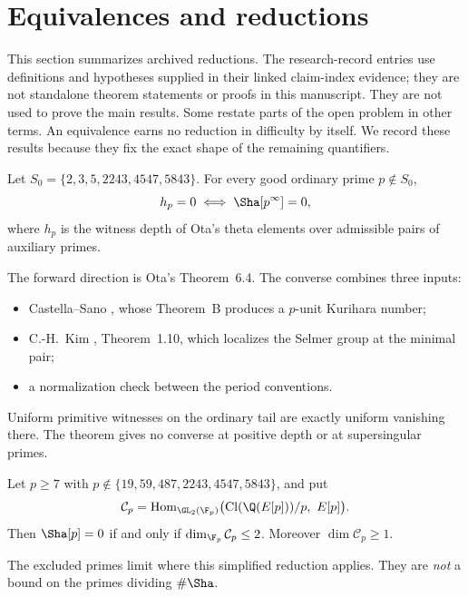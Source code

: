 \section{Equivalences and reductions}\label{sec:reductions}

This section summarizes archived reductions. The research-record entries use definitions and hypotheses supplied in their linked claim-index evidence; they are not standalone theorem statements or proofs in this manuscript. They are not used to prove the main results. Some restate parts of the open problem in other terms. An equivalence earns no reduction in difficulty by itself. We record these results because they fix the exact shape of the remaining quantifiers.

\begin{researchrecord}\label{thm:o1}
Let $S_0=\{2,3,5,2243,4547,5843\}$. For every good ordinary prime $p\notin S_0$,
\[
h_p=0\iff\Sha[p^\infty]=0 ,
\]
where $h_p$ is the witness depth of Ota's theta elements \cite{ota} over admissible pairs of auxiliary primes.
\end{researchrecord}
The forward direction is Ota's Theorem~6.4. The converse combines three inputs:
\begin{itemize}[leftmargin=*]
\item Castella--Sano \cite{castellasano}, whose Theorem~B produces a $p$-unit Kurihara number;
\item C.-H.~Kim \cite{kimch}, Theorem~1.10, which localizes the Selmer group at the minimal pair;
\item a normalization check between the period conventions.
\end{itemize}
Uniform primitive witnesses on the ordinary tail are exactly uniform vanishing there. The theorem gives no converse at positive depth or at supersingular primes.

\begin{researchrecord}\label{thm:divfield}\leavevmode\par
Let $p\ge7$ with $p\notin\{19,59,487,2243,4547,5843\}$, and put
\[
\mathcal C_p=\mathrm{Hom}_{\GL_2(\F_p)}\bigl(\mathrm{Cl}(\Q(E[p]))/p,\ E[p]\bigr).
\]
Then $\Sha[p]=0$ if and only if $\dim_{\F_p}\mathcal C_p\le2$. Moreover $\dim\mathcal C_p\ge1$.
\end{researchrecord}
The excluded primes limit where this simplified reduction applies. They are \emph{not} a bound on the primes dividing $\#\Sha$.

